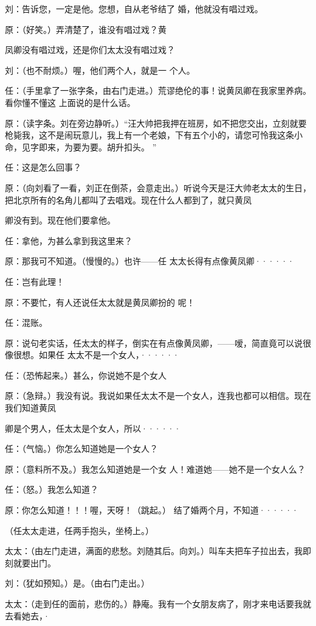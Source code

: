 \documentclass{article}
\begin{document}
刘：告诉您，一定是他。您想，自从老爷结了
婚，他就没有唱过戏。 

原：（好笑。）弄清楚了，谁没有唱过戏？黄
\newpage

凤卿没有唱过戏，还是你们太太没有唱过戏？ 

刘：（也不耐烦。）喔，他们两个人，就是一
个人。 

任：（手里拿了一张字条，由右门走进。）荒谬绝伦的事！说黄凤卿在我家里养病。看你懂不懂这
上面说的是什么话。 

原：（读字条。刘在旁边静听。）“汪大帅把我押在班房，如不把您交出，立刻就要枪毙我，这不是闹玩意儿，我上有一个老娘，下有五个小的，请您可怜我这条小命，见字即来，为要为要。胡升扣头。
” 


任：这是怎么回事？ 

原：（向刘看了一看，刘正在倒茶，会意走出。）听说今天是汪大帅老太太的生日，把北京所有的名角儿都叫了去唱戏。现在什么人都到了，就只黄凤

\newpage
卿没有到。现在他们要拿他。 


任：拿他，为甚么拿到我这里来？ 

原：那我可不知道。（慢慢的。）也许——任
太太长得有点像黄凤卿······ 


任：岂有此理！ 

原：不要忙，有人还说任太太就是黄凤卿扮的
呢！ 


任：混账。 

原：说句老实话，任太太的样子，倒实在有点像黄凤卿，——嗳，简直竟可以说很像很想。如果任
太太不是一个女人，······ 

任：（恐怖起来。）甚么，你说她不是个女人

原：（急辩。）我没有说。我说如果任太太不是一个女人，连我也都可以相信。现在我们知道黄凤
\newpage

卿是个男人，任太太是个女人，所以······ 


任：（气恼。）你怎么知道她是一个女人？ 

原：（意料所不及。）我怎么知道她是一个女
人！难道她——她不是一个女人么？ 


任：（怒。）我怎么知道？ 

原：你怎么知道！！！喔，天呀！（跳起。）
结了婚两个月，不知道······ 


（任太太走进，任两手抱头，坐椅上。） 

太太：（由左门走进，满面的悲愁。刘随其后。向刘。）叫车夫把车子拉出去，我即刻就要出门。


刘：（犹如预知。）是。（由右门走出。） 

太太：（走到任的面前，悲伤的。）静庵。我有一个女朋友病了，刚才来电话要我就去看她去，·
\newpage
\end{document}
